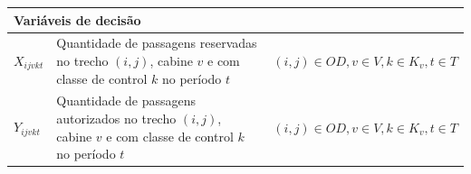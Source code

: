 \begin{table}[H]
\begin{tabular}{p{2cm} p{9.5cm} p{3.2cm}}
		\multicolumn{3}{l}{\textbf{Variáveis de decisão}}                                                                                                                                                                                                                                                                                                                                                                                                                                                 \\ \midrule
		$X_{ijvkt}$        & Quantidade de passagens reservadas no trecho $(i,j)$, cabine $v$ e com classe de control $k$ no período $t$                                                                                                                                                                                                                                                                                                                    & $(i,j) \in OD, v \in V, k \in K_v, t \in T$  \\
		$Y_{ijvkt}$        & Quantidade de passagens autorizados no trecho $(i,j)$, cabine $v$ e com classe de control $k$ no período $t$                                                                                                                                                                                                                                                                                                                   & $(i,j) \in OD, v \in V, k \in K_v, t \in T$  \\

\end{tabular}
\end{table}
